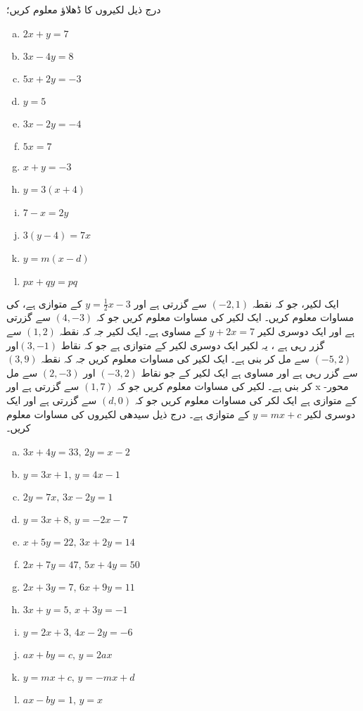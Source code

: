 درج ذیل لکیروں کا ڈھلاؤ معلوم کریں؛
\begin{multicols}{4}
\begin{enumerate}[a.]
\item \(2x+y=7 \)
\item \(3x-4y=8 \)
\item \(5x+2y=-3\)
\item \(y=5 \)
\item \(3x-2y =-4 \)
\item \(5x=7 \)
\item \(x+y=-3 \)
\item \(y=3(x+4) \)
\item \(7-x=2y \)
\item \(3(y-4) =7x \)
\item \(y=m(x-d) \)
\item \(px+qy=pq \)
\end{enumerate}
\end{multicols}
ایک لکیر، جو کہ نقطہ \( (-2,1) \) سے گزرتی ہے اور \( y=\frac{1}{2}x-3 \) کے متوازی ہے، کی مساوات معلوم کریں۔
ایک لکیر کی مساوات معلوم کریں جو کہ \((4,-3)\) سے گزرتی ہے اور ایک دوسری لکیر \( y+2x=7 \) کے مساوی ہے۔
ایک لکیر جہ کہ نقطہ \((1,2)\) سے گزر رہی ہے ، یہ لکیر ایک دوسری لکیر کے متوازی ہے جو کہ نقاط \( (3,-1)\)اور \( (-5,2) \) سے مل کر بنی ہے۔
ایک لکیر کی مساوات معلوم کریں جہ کہ نقطہ \(  (3,9) \) سے گزر رہی ہے اور مساوی ہے ایک لکیر کے جو نقاط \( (-3,2) \) اور \( (2, -3) \) سے مل کر بنی ہے۔
لکیر کی مساوات معلوم کریں جو کہ \( (1,7) \) سے گزرتی ہے اور  x -محور کے متوازی ہے
ایک لکر کی مساوات معلوم کریں جو کہ \( (d,0) \) سے گزرتی ہے اور ایک دوسری لکیر \( y=mx+c \) کے متوازی ہے۔
درج ذیل سیدھی لکیروں کی مساوات معلوم کریں۔
\begin{multicols}{2}
\begin{enumerate}[a.]
\item \(3x+4y=33, \, 2y=x-2 \)
\item \(y=3x+1 , \, y=4x-1 \)
\item \(2y=7x, \, 3x-2y=1 \)
\item \(y=3x+8 , \, y=-2x-7 \)
\item \(x+5y=22 , \, 3x+2y=14 \)
\item \(2x+7y=47, \, 5x+4y=50 \)
\item \(2x+3y=7, \, 6x+9y =11 \)
\item \(3x+y=5, \, x+3y=-1 \)
\item \(y=2x+3, \, 4x-2y =-6 \)
\item \(ax+by=c, \, y=2ax \)
\item \(y=mx+c, \, y=-mx+d \)
\item \(ax-by=1, \, y=x \)
\end{enumerate}
 \end{multicols}
